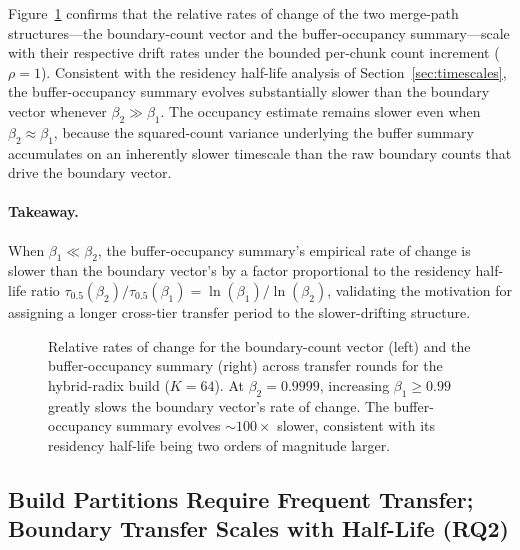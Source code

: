 \documentclass{article}
\begin{document}
Figure~\ref{fig:rates_of_change} confirms that the relative rates of change of
the two merge-path structures---the boundary-count vector and the
buffer-occupancy summary---scale with their respective drift rates under the
bounded per-chunk count increment ($\rho = 1$). Consistent with the residency
half-life analysis of Section~\ref{sec:timescales}, the buffer-occupancy summary
evolves substantially slower than the boundary vector whenever $\beta_2 \gg
\beta_1$. The occupancy estimate remains slower even when $\beta_2 \approx
\beta_1$, because the squared-count variance underlying the buffer summary
accumulates on an inherently slower timescale than the raw boundary counts that
drive the boundary vector.

\paragraph{Takeaway.}
When $\beta_1 \ll \beta_2$, the buffer-occupancy summary's empirical rate of
change is slower than the boundary vector's by a factor proportional to the
residency half-life ratio $\tau_{0.5}(\beta_2)/\tau_{0.5}(\beta_1) =
\ln(\beta_1)/\ln(\beta_2)$, validating the motivation for assigning a longer
cross-tier transfer period to the slower-drifting structure.

\begin{figure}[t]
\centering
\caption{Relative rates of change for the boundary-count vector (left) and the
buffer-occupancy summary (right) across transfer rounds for the hybrid-radix
build ($K = 64$). At $\beta_2 = 0.9999$, increasing $\beta_1 \geq 0.99$ greatly
slows the boundary vector's rate of change. The buffer-occupancy summary evolves
${\sim}100\times$ slower, consistent with its residency half-life being two
orders of magnitude larger.}
\label{fig:rates_of_change}
\end{figure}

\subsection{Build Partitions Require Frequent Transfer; Boundary Transfer Scales
with Half-Life (RQ2)}
\label{sec:rq2}
\end{document}
